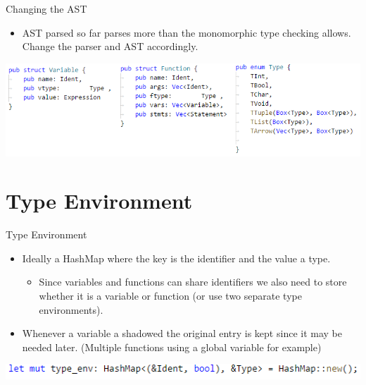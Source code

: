 \documentclass[10pt]{beamer}
\begin{document}
\begin{frame}{Changing the AST}
    \begin{itemize}
        \item AST parsed so far parses more than the monomorphic type checking allows. Change the parser and AST accordingly.
    \end{itemize}
    \includegraphics[width=\textwidth]{presentation2/AST-changed.png}
\end{frame}

\section{Type Environment}
\begin{frame}{Type Environment}
    \begin{itemize}
        \item Ideally a HashMap where the key is the identifier and the value a type.
            \begin{itemize}
                \item Since variables and functions can share identifiers we also need to store whether it is a variable or function (or use two separate type environments).
            \end{itemize}
        \item Whenever a variable a shadowed the original entry is kept since it may be needed later. (Multiple functions using a global variable for example)
    \end{itemize}
    \includegraphics[width=\textwidth]{presentation2/type_env.png}
\end{frame}
\end{document}
